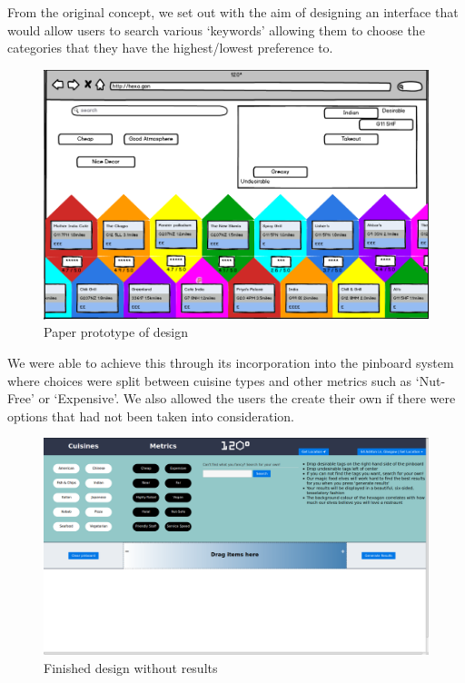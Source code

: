 \documentclass[10pt,a4paper]{article}
\begin{document}
From the original concept, we set out with the aim of designing an interface that would allow users to search various ‘keywords’ allowing them to choose the categories that they have the highest/lowest preference to. 

\begin{figure}[H]
	\begin{center}
		\includegraphics[scale=0.37]{Screenshot.png}
		\caption{Paper prototype of design}
		\label{figure:prototype}
	\end{center}
\end{figure}


We were able to achieve this through its incorporation into the pinboard system where choices were split between cuisine types and other metrics such as ‘Nut-Free’ or ‘Expensive’. We also allowed the users the create their own if there were options that had not been taken into consideration.

\begin{figure}[H]
	\begin{center}
		\includegraphics[scale=0.2]{newScreenshot.png}
		\caption{Finished design without results}
		\label{figure:finished-design-no-results}
	\end{center}
\end{figure}
\end{document}
